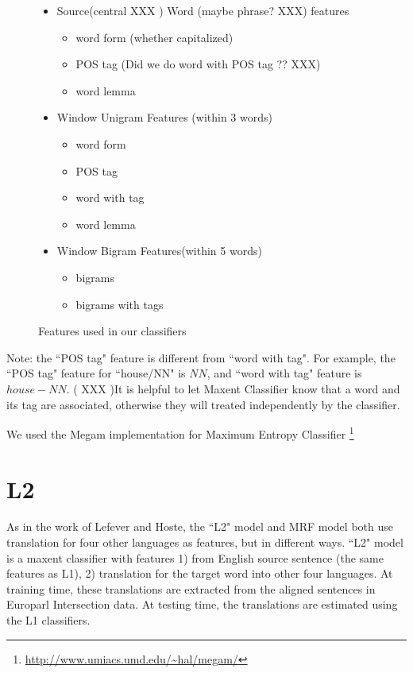\documentclass[11pt,letterpaper]{article}
\begin{document}
\begin{figure}
  \begin{itemize}  %
  
  \item Source(central XXX ) Word (maybe phrase? XXX) features 
  \begin{itemize}  %
	    \item word form (whether capitalized)
       \item POS tag   (Did we do word with POS tag ?? XXX)
       \item word lemma
  \end{itemize}
  \item Window Unigram Features (within 3 words)
  \begin{itemize} %
  		\item word form
  		\item POS tag
  		\item word with tag
  		\item word lemma
  \end{itemize}
  \item Window Bigram Features(within 5 words)
  \begin{itemize} %
  		\item bigrams 
  		\item bigrams with tags
  \end{itemize}  
  
  
  \end{itemize}   %
  \label{features}
  \caption{Features used in our classifiers}
\end{figure}

Note: the ``POS tag" feature is different from ``word with tag". For example, the ``POS tag" feature for
``house/NN" is $NN$, and ``word with tag" feature is $house-NN$.  ( XXX )It is helpful to let Maxent Classifier know that a word and its  tag are associated, otherwise they will treated independently by the classifier.

We used the Megam implementation for Maximum Entropy Classifier \footnote{\url{http://www.umiacs.umd.edu/~hal/megam/}}
\cite{daume04cg-bfgs}
\section{L2}
As in the work of Lefever and Hoste, the ``L2" model and MRF model both use
translation for four other languages as features, but in different ways.  ``L2"
model is a maxent classifier with features 1) from English source sentence (the
same features as L1), 2) translation for the target word into other four
languages.  At training time, these translations are extracted from the aligned
sentences in Europarl Intersection data.  At testing time, the translations are
estimated using the L1 classifiers. 
\end{document}

